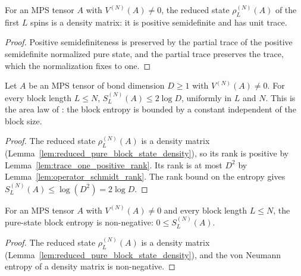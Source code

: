 \begin{lemma}
    \label{lem:reduced_pure_block_state_density}
    \leanok
    For an MPS tensor $A$ with $V^{(N)}(A)\neq0$, the reduced state
    $\rho_L^{(N)}(A)$ of the first $L$ spins is a density matrix: it is positive
    semidefinite and has unit trace.
\end{lemma}
\begin{proof}\leanok
    Positive semidefiniteness is preserved by the partial trace of the positive
    semidefinite normalized pure state, and the partial trace preserves the trace,
    which the normalization fixes to one.
\end{proof}

\begin{lemma}\label{prop:pure_area_upper}
    \leanok
    Let $A$ be an MPS tensor of bond dimension $D\geq1$ with
    $V^{(N)}(A)\neq0$. For every block length $L\le N$,
    $S_L^{(N)}(A)\leq2\log D$, uniformly in $L$ and $N$. This is the area law of
    \cite[Section~3, line~599]{Cirac2016MPDO_arXiv}: the block entropy is bounded
    by a constant independent of the block size.
\end{lemma}
\begin{proof}\leanok
    The reduced state $\rho_L^{(N)}(A)$ is a density matrix
    (Lemma~\ref{lem:reduced_pure_block_state_density}), so its rank is positive
    by Lemma~\ref{lem:trace_one_positive_rank}. Its rank is at most $D^2$ by
    Lemma~\ref{lem:operator_schmidt_rank}. The rank bound on the entropy gives
    $S_L^{(N)}(A)\leq\log(D^2)=2\log D$.
\end{proof}

\begin{lemma}
    \label{lem:pure_block_entropy_nonneg}
    \leanok
    For an MPS tensor $A$ with $V^{(N)}(A)\neq0$ and every block length
    $L\le N$, the pure-state block entropy is non-negative:
    $0\le S_L^{(N)}(A)$.
\end{lemma}
\begin{proof}\leanok
    The reduced state $\rho_L^{(N)}(A)$ is a density matrix
    (Lemma~\ref{lem:reduced_pure_block_state_density}), and the von Neumann
    entropy of a density matrix is non-negative.
\end{proof}


